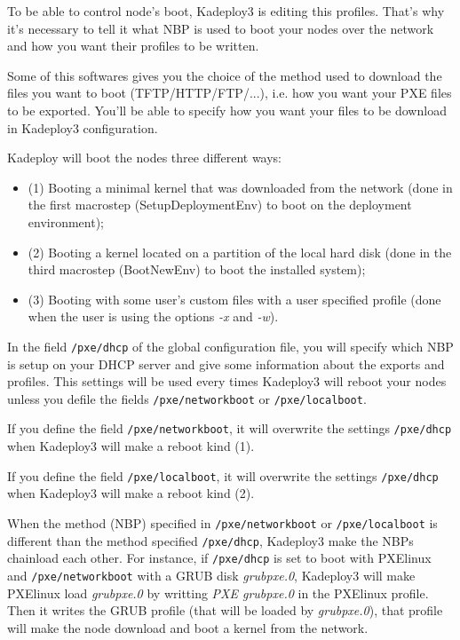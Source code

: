\documentclass[a4wide,10pt,oneside]{book}
\newcommand{\ypath}[1]{\texttt{#1}}
\begin{document}
To be able to control node's boot, Kadeploy3 is editing this profiles. That's why it's necessary to tell it what NBP is used to boot your nodes over the network and how you want their profiles to be written.

Some of this softwares gives you the choice of the method used to download the files you want to boot (TFTP/HTTP/FTP/...), i.e. how you want your PXE files to be exported. You'll be able to specify how you want your files to be download in Kadeploy3 configuration.

Kadeploy will boot the nodes three different ways:
\begin{itemize}
  \item (1) Booting a minimal kernel that was downloaded from the network (done in the first macrostep (SetupDeploymentEnv) to boot on the deployment environment);
  \item (2) Booting a kernel located on a partition of the local hard disk (done in the third macrostep (BootNewEnv) to boot the installed system);
  \item (3) Booting with some user's custom files with a user specified profile (done when the user is using the options \emph{-x} and \emph{-w}).
\end{itemize}

In the field \ypath{/pxe/dhcp} of the global configuration file, you will specify which NBP is setup on your DHCP server and give some information about the exports and profiles. This settings will be used every times Kadeploy3 will reboot your nodes unless you defile the fields \ypath{/pxe/networkboot} or \ypath{/pxe/localboot}.

If you define the field \ypath{/pxe/networkboot}, it will overwrite the settings \ypath{/pxe/dhcp} when Kadeploy3 will make a reboot kind (1).

If you define the field \ypath{/pxe/localboot}, it will overwrite the settings \ypath{/pxe/dhcp} when Kadeploy3 will make a reboot kind (2).

When the method (NBP) specified in \ypath{/pxe/networkboot} or \ypath{/pxe/localboot} is different than the method specified \ypath{/pxe/dhcp}, Kadeploy3 make the NBPs chainload each other. For instance, if \ypath{/pxe/dhcp} is set to boot with PXElinux and \ypath{/pxe/networkboot} with a GRUB disk \emph{grubpxe.0}, Kadeploy3 will make PXElinux load \emph{grubpxe.0} by writting \emph{PXE grubpxe.0} in the PXElinux profile. Then it writes the GRUB profile (that will be loaded by \emph{grubpxe.0}), that profile will make the node download and boot a kernel from the network.
\end{document}
